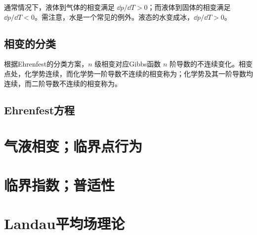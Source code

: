 		通常情况下，液体到气体的相变满足 $\dd p / \dd T > 0$；而液体到固体的相变满足 $\dd p / \dd T < 0$。需注意，水是一个常见的例外。液态的水变成冰，$\dd p / \dd T > 0$。
		
	\subsection{相变的分类}
		根据Ehrenfest的分类方案，$n$ 级相变对应Gibbs函数 $n$ 阶导数的不连续变化。相变点处，化学势连续，而化学势一阶导数不连续的相变称为；化学势及其一阶导数均连续，而二阶导数不连续的相变称为。
		
	\subsection{Ehrenfest方程}
\section{气液相变；临界点行为}
\section{临界指数；普适性}
\section{Landau平均场理论}
	
\raggedbottom%
\pagebreak